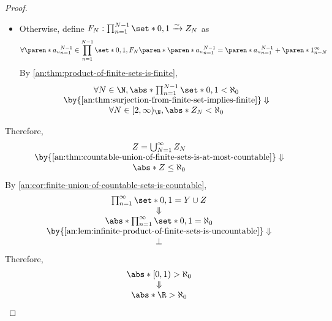 \begin{proof}
\begin{itemize}
\[          \]
    \item Otherwise, define $F_{N}: \prod_{n = 1}^{N - 1} \set*{0, 1} \xrightarrow{\sim} Z_{N}$ as
          \[
            \forall \paren*{a_{n}}_{n = 1}^{N - 1} \in \prod_{n = 1}^{N - 1} \set*{0, 1},
            F_{N}\paren*{\paren*{a_{n}}_{n = 1}^{N - 1}} = \paren*{a_{n}}_{n = 1}^{N - 1} + \paren*{1}_{n = N}^{\infty}
          \]
          By \cref{an:thm:product-of-finite-sets-is-finite},
          \[
            \begin{array}{c}
              \forall N \in \N, \abs*{\prod_{n = 1}^{N - 1} \set*{0, 1}} < \aleph_{0} \\
              \by{\Cref{an:thm:surjection-from-finite-set-implies-finite}} \Downarrow \\
              \forall N \in [2, \infty)_{\N}, \abs*{Z_{N}} < \aleph_{0}
            \end{array}
          \]
  \end{itemize}
  Therefore,
  \[
    \begin{array}{c}
      Z = \bigcup_{N = 1}^{\infty} Z_{N}                                                \\
      \by{\Cref{an:thm:countable-union-of-finite-sets-is-at-most-countable}} \Downarrow \\
      \abs*{Z} \leq \aleph_{0}
    \end{array}
  \]
  By \cref{an:cor:finite-union-of-countable-sets-is-countable},
  \[
    \begin{array}{c}
      \prod_{n = 1}^{\infty} \set*{0, 1} = Y \cup Z                                \\
      \Downarrow                                                                   \\
      \abs*{\prod_{n = 1}^{\infty} \set*{0, 1}} = \aleph_{0}                       \\
      \by{\Cref{an:lem:infinite-product-of-finite-sets-is-uncountable}} \Downarrow \\
      \bot
    \end{array}
  \]
  Therefore,
  \[
    \begin{array}{c}
      \abs*{[0, 1)} > \aleph_{0} \\
      \Downarrow                 \\
      \abs*{\R} > \aleph_{0}
    \end{array}
  \]
\end{proof}

